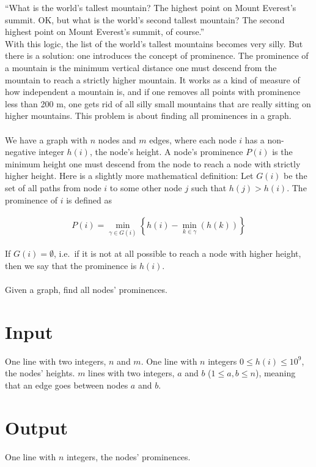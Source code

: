 
\def\version{1}

``What is the world's tallest mountain? The highest point on Mount Everest's summit. OK, but what is the world's second tallest mountain? The second highest point on Mount Everest's summit, of course.''\\
With this logic, the list of the world's tallest mountains becomes very silly. But there is a solution: one introduces the concept of prominence. The prominence of a mountain is the minimum vertical distance one must descend from the mountain to reach a strictly higher mountain. It works as a kind of measure of how independent a mountain is, and if one removes all points with prominence less than 200 m, one gets rid of all silly small mountains that are really sitting on higher mountains. This problem is about finding all prominences in a graph.
\\\\
We have a graph with $n$ nodes and $m$ edges, where each node $i$ has a non-negative integer $h(i)$, the node's height. A node's prominence $P(i)$ is the minimum height one must descend from the node to reach a node with strictly higher height. Here is a slightly more mathematical definition:
Let $G(i)$ be the set of all paths from node $i$ to some other node $j$ such that $h(j) > h(i)$. The prominence of $i$ is defined as

\begin{align*} 
P(i) =  \min_{\gamma \in G(i)}  \left\{   h(i) - \min_{k\in \gamma}(h(k))  \right\}
\end{align*} 

If $G(i) = \emptyset$, i.e.\ if it is not at all possible to reach a node with higher height, then we say that the prominence is $h(i)$. \\\\
Given a graph, find all nodes' prominences.

\section*{Input}
One line with two integers, $n$ and $m$. One line with $n$ integers $0 \leq h(i) \leq 10^9$, the nodes' heights. $m$ lines with two integers, $a$ and $b$ ($1 \leq a,b \leq n$), meaning that an edge goes between nodes $a$ and $b$.

\section*{Output}
One line with $n$ integers, the nodes' prominences.

